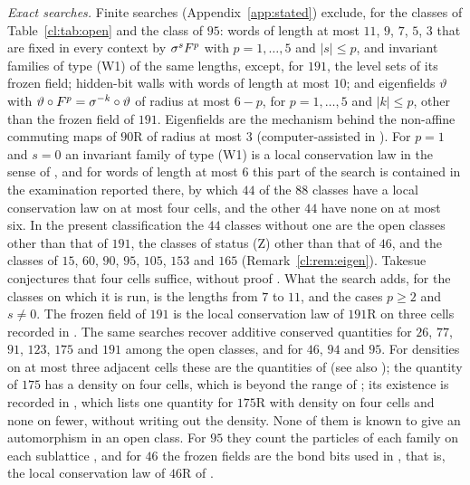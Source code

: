\begin{sloppypar}
\emph{Exact searches.} Finite searches (Appendix~\ref{app:stated}) exclude, for the classes of Table~\ref{cl:tab:open} and the class of $95$: words of length at most $11$, $9$, $7$, $5$, $3$ that are fixed in every context by $\sigma^sF^p$ with $p=1,\dots,5$ and $|s|\le p$, and invariant families of type (W1) of the same lengths, except, for $191$, the level sets of its frozen field; hidden-bit walls with words of length at most $10$; and eigenfields $\vartheta$ with $\vartheta\circ F^p=\sigma^{-k}\circ\vartheta$ of radius at most $6-p$, for $p=1,\dots,5$ and $|k|\le p$, other than the frozen field of $191$. Eigenfields are the mechanism behind the non-affine commuting maps of $90$R of radius at most $3$ (computer-assisted in \cite{PaperC}). For $p=1$ and $s=0$ an invariant family of type (W1) is a local conservation law in the sense of \cite[Section~4]{Takesue1989}, and for words of length at most $6$ this part of the search is contained in the examination reported there, by which $44$ of the $88$ classes have a local conservation law on at most four cells, and the other $44$ have none on at most six. In the present classification the $44$ classes without one are the open classes other than that of $191$, the classes of status (Z) other than that of $46$, and the classes of $15$, $60$, $90$, $95$, $105$, $153$ and $165$ (Remark~\ref{cl:rem:eigen}). Takesue conjectures that four cells suffice, without proof \cite[p.~391]{Takesue1989}. What the search adds, for the classes on which it is run, is the lengths from $7$ to $11$, and the cases $p\ge2$ and $s\ne0$. The frozen field of $191$ is the local conservation law of $191$R on three cells recorded in \cite[Table~3]{HT1991}. The same searches recover additive conserved quantities for $26$, $77$, $91$, $123$, $175$ and $191$ among the open classes, and for $46$, $94$ and $95$. For densities on at most three adjacent cells these are the quantities of \cite[Tables~3 and~4]{HT1991} (see also \cite{Takesue1989,Takesue1995,Takesue1997}); the quantity of $175$ has a density on four cells, which is beyond the range of \cite{HT1991}; its existence is recorded in \cite[Table~1]{Takesue1997}, which lists one quantity for $175$R with density on four cells and none on fewer, without writing out the density. None of them is known to give an automorphism in an open class. For $95$ they count the particles of each family on each sublattice \cite{PaperE}, and for $46$ the frozen fields are the bond bits used in \cite{PaperA}, that is, the local conservation law of $46$R of \cite[(4.4)--(4.6)]{Takesue1989}.
\end{sloppypar}

